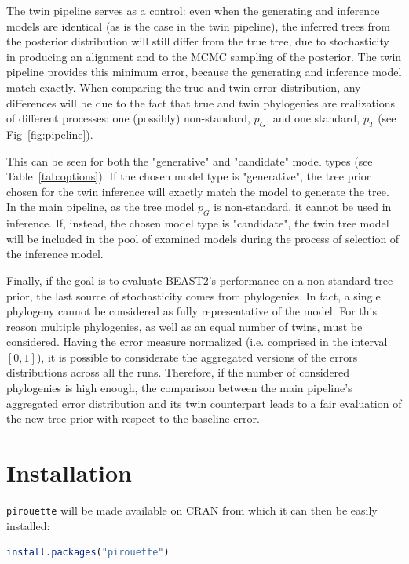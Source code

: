 The twin pipeline serves as a control: 
even when the generating and inference models are identical
(as is the case in the twin pipeline),
the inferred trees from the posterior distribution will 
still differ from the true tree, 
due to stochasticity in producing an alignment 
and to the MCMC sampling of the posterior.
The twin pipeline provides this minimum error,
because the generating and inference model match exactly.
When comparing the true and twin error distribution,
any differences will be due to the fact that true and twin phylogenies are realizations 
of different processes: one (possibly) non-standard, $p_G$, 
and one standard, $p_T$ (see Fig~\ref{fig:pipeline}).

This can be seen for both the "generative" and "candidate" model 
types (see Table~\ref{tab:options}).
If the chosen model type is "generative", 
the tree prior chosen for the twin inference will  
exactly match the model to generate the tree.
In the main pipeline, as the tree model $p_{G}$ is non-standard, 
it cannot be used in inference.
If, instead, the chosen model type is "candidate", 
the twin tree model will be included in the pool of examined models 
during the process of selection of the inference model. 

Finally, if the goal is to evaluate BEAST2's performance on a non-standard tree prior, 
the last source of stochasticity comes from phylogenies. 
In fact, a single phylogeny cannot be considered 
as fully representative of the model. 
For this reason multiple phylogenies, 
as well as an equal number of twins, 
must be considered. 
Having the error measure normalized (i.e. comprised in the interval $[0, 1]$), 
it is possible to considerate the aggregated versions of the errors distributions 
across all the runs.
Therefore, if the number of considered phylogenies is high enough, 
the comparison between the main pipeline's aggregated error distribution 
and its twin counterpart leads to a fair evaluation 
of the new tree prior with respect to the baseline error.

\section{Installation}

\verb;pirouette; will be made available on CRAN from which 
it can then be easily installed:
\begin{lstlisting}[language=R, floatplacement=ht, frame=single]
install.packages("pirouette")
\end{lstlisting}

